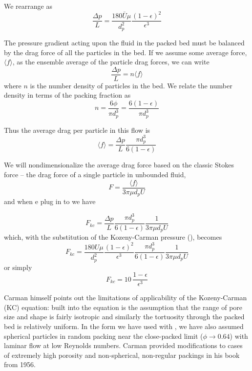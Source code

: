 We rearrange  as
\begin{equation}\label{eq:K-C-pressure}
    \frac{\Delta p}{L} = \frac{180 \bar{U} \mu}{d_p^2} \frac{(1-\epsilon)^2}{\epsilon^3}
\end{equation}

The pressure gradient acting upon the fluid in the packed bed must be balanced by the drag force of all the particles in the bed. If we assume some average force, $\langle f \rangle$, as the ensemble average of the particle drag forces, we can write
\begin{equation}
    \frac{\Delta p}{L} = n \langle f \rangle
\end{equation}
where $n$ is the number density of particles in the bed. We relate the number density in terms of the packing fraction as
\begin{equation}
    n = \frac{6\phi}{\pi d_p^3} = \frac{6(1-\epsilon)}{\pi d_p^3}
\end{equation}

Thus the average drag per particle in this flow is
\begin{equation}\label{eq:average-drag}
    \langle f \rangle = \frac{\Delta p}{L}\frac{\pi d_p^3}{6(1-\epsilon)}
\end{equation}

We will nondimensionalize the average drag force based on the classic Stokes force -- the drag force of a single particle in unbounded fluid,
\begin{equation}\label{eq:non-dim-drag}
    F = \frac{\langle f \rangle}{3\pi \mu d_p U}
\end{equation}
and when e plug in  to  we have

\begin{equation}
    F_{kc} = \frac{\Delta p}{L}\frac{\pi d_p^3}{6(1-\epsilon)}\frac{1}{3\pi \mu d_p U}
\end{equation}
which, with the substitution of the Kozeny-Carman pressure (), becomes
\begin{equation}
    F_{kc} = \frac{180 U \mu}{d_p^2} \frac{(1-\epsilon)^2}{\epsilon^3}\frac{\pi d_p^3}{6(1-\epsilon)}\frac{1}{3\pi \mu d_p U}
\end{equation}
or simply
\begin{equation}\label{eq:K-C-non-dim}
    F_{kc} = 10\, \frac{1-\epsilon}{\epsilon^3}
\end{equation}

Carman himself\cite{Carman1956} points out the limitations of applicability of the Kozeny-Carman (KC) equation: built into the equation is the assumption that the range of pore size and shape is fairly isotropic and similarly the tortuosity through the packed bed is relatively uniform. In the form we have used with , we have also assumed spherical particles in random packing near the close-packed limit ($\phi \rightarrow 0.64$) with laminar flow at low Reynolds numbers. Carman provided modifications to cases of extremely high porosity and non-spherical, non-regular packings in his book from 1956.\cite{Carman1956}

